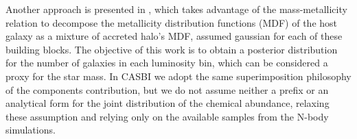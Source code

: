 Another approach is presented in \cite{deasonUnravellingMassSpectrum2023}, which takes advantage of the mass-metallicity relation to decompose the metallicity distribution functions (MDF) of the host galaxy as a mixture of accreted halo's MDF, assumed gaussian for each of these building blocks. The objective of this work is to obtain a posterior distribution for the number of galaxies in each luminosity bin, which can be considered a proxy for the star mass. In CASBI we adopt the same superimposition philosophy of the components contribution, but we do not assume neither a prefix or an analytical form for the joint distribution of the chemical abundance, relaxing these assumption and relying only on the available samples from the N-body simulations.  